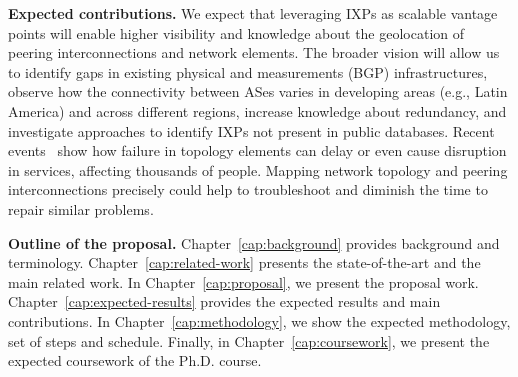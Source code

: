 
	\textbf{Expected contributions.} We expect that leveraging IXPs as scalable vantage points will enable higher visibility and knowledge about the geolocation of peering interconnections and network elements. The broader vision will allow us to identify gaps in existing physical and measurements (BGP) infrastructures, observe how the connectivity between ASes varies in developing areas (e.g., Latin America) and across different regions, increase knowledge about redundancy, and investigate approaches to identify IXPs not present in public databases. 
	Recent events~\cite{routerDMV, routerUnited} show how failure in topology elements can delay or even cause disruption in services, affecting thousands of people. Mapping network topology and peering interconnections precisely could help to troubleshoot and diminish the time to repair similar problems.

	\textbf{Outline of the proposal.} Chapter~\ref{cap:background} provides background and terminology. Chapter~\ref{cap:related-work} presents the state-of-the-art and the main related work. In Chapter~\ref{cap:proposal}, we present the proposal work. Chapter~\ref{cap:expected-results} provides the expected results and main contributions. In Chapter~\ref{cap:methodology}, we show the expected methodology, set of steps and schedule. Finally, in Chapter~\ref{cap:coursework}, we present the expected coursework of the Ph.D. course.


